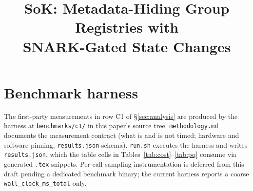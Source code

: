 \documentclass[conference]{IEEEtran}
\title{SoK: Metadata-Hiding Group Registries with\\SNARK-Gated State Changes}
\author{\IEEEauthorblockN{Anonymous Submission}}
\author{
    \IEEEauthorblockN{TODO Author Name}
    \IEEEauthorblockA{TODO Affiliation\\
                      TODO email}
  }
\begin{document}
\maketitle

















\appendices

\section{Benchmark harness}
\label{app:bench}

The first-party measurements in row C1 of
\S\ref{sec:analysis} are produced by the harness at
\texttt{benchmarks/c1/} in this paper's source tree. \texttt{methodology.md} documents the measurement contract
(what is and is not timed; hardware and software pinning;
\texttt{results.json} schema). \texttt{run.sh} executes the harness
and writes \texttt{results.json}, which the table cells in
Tables~\ref{tab:cost}--\ref{tab:pq} consume via generated
\texttt{.tex} snippets. Per-call sampling instrumentation is
deferred from this draft pending a dedicated benchmark
binary; the current harness reports a coarse
\texttt{wall\_clock\_ms\_total} only.
\end{document}
